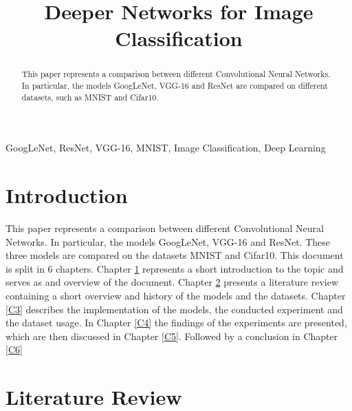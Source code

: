 \documentclass[conference]{IEEEtran}
\begin{document}
\title{Deeper Networks for Image Classification}

\author{
}

\maketitle

\begin{abstract}
This paper represents a comparison between different Convolutional Neural Networks. In particular, the models GoogLeNet, VGG-16 and ResNet are compared on different datasets, such as MNIST and Cifar10.
\end{abstract}

\begin{IEEEkeywords}
GoogLeNet, ResNet, VGG-16, MNIST, Image Classification, Deep Learning
\end{IEEEkeywords}

\section{Introduction}\label{C1}
This paper represents a comparison between different Convolutional Neural Networks. In particular, the models GoogLeNet, VGG-16 and ResNet. These three models are compared on the datasets MNIST and Cifar10.
This document is split in 6 chapters. Chapter \ref{C1} represents a short introduction to the topic and serves as and overview of the document.
Chapter \ref{C2} presents a literature review containing a short overview and history of the models and the datasets.
Chapter \ref{C3} describes the implementation of the models, the conducted experiment and the dataset usage.
In Chapter \ref{C4} the findings of the experiments are presented, which are then discussed in Chapter \ref{C5}.
Followed by a conclusion in Chapter \ref{C6}

\section{Literature Review}\label{C2}
\end{document}
